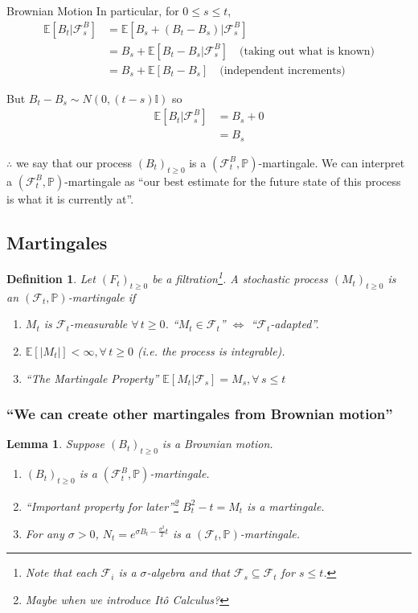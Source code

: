 \documentclass[12pt]{article}
\newtheorem{definition}{Definition}
\newtheorem{lemma}{Lemma}
\newlength\tindent
\renewcommand{\indent}{\hspace*{\tindent}}
\begin{document}
\begin{section}{Brownian Motion}
In particular, for $0 \leq s \leq t$,
\begin{align*}
	\mathbb E[B_t | \mathcal F^B_s] &= \mathbb E[B_s + (B_t - B_s)|\mathcal F^B_s] \\
	&= B_s + \mathbb E[B_t - B_s|\mathcal F^B_s] \quad \text{(taking out what is known)} \\
	&= B_s + \mathbb E[B_t - B_s] \quad \text{(independent increments)}
\end{align*}

But $B_t - B_s \sim N(0,(t - s)\mathbb I)$ so
\begin{align*}
	\mathbb E[B_t | \mathcal F^B_s] &= B_s + 0 \\
	&= B_s
\end{align*}

\indent $\therefore$ we say that our process $(B_t)_{t\geq0}$ is a $(\mathcal F^B_t, \mathbb P)$-martingale. We can interpret a $(\mathcal F^B_t, \mathbb P)$-martingale as ``our best estimate for the future state of this process is what it is currently at''.

\subsection{Martingales}
\begin{definition} Let $(F_t)_{t\geq0}$ be a filtration\footnote{Note that each $\mathcal F_i$ is a $\sigma$-algebra and that $\mathcal F_s \subseteq \mathcal F_t$ for $s \leq t$.}. A stochastic process $(M_t)_{t\geq0}$ is an $(\mathcal F_t, \mathbb P)$-martingale if
\begin{enumerate}
	\item $M_t$ is $\mathcal F_t$-measurable $\forall\,t\geq 0$. ``$M_t \in \mathcal F_t $'' $\iff$ ``$\mathcal F_t$-adapted''.
	\item $\mathbb E[|M_t|] < \infty, \forall\,t\geq0$ (i.e. the process is integrable).
	\item ``The Martingale Property'' $\mathbb E[M_t|\mathcal F_s] = M_s, \forall\,s\leq t$
\end{enumerate}
\end{definition}

\subsubsection{``We can create other martingales from Brownian motion''}

\begin{lemma} Suppose $(B_t)_{t\geq0}$ is a Brownian motion.
\begin{enumerate}
	\item $(B_t)_{t\geq0}$ is a $(\mathcal F^B_t, \mathbb P)$-martingale.
	\item ``Important property for later''\footnote{Maybe when we introduce It\^{o} Calculus?} $B^2_t - t = M_t$ is a martingale.
	\item For any $\sigma>0$, $N_t = e^{\sigma B_t - \frac{\sigma^2}{2}t}$ is a $(\mathcal F_t, \mathbb P)$-martingale.
\end{enumerate}


\end{lemma}
\end{section}
\end{document}
